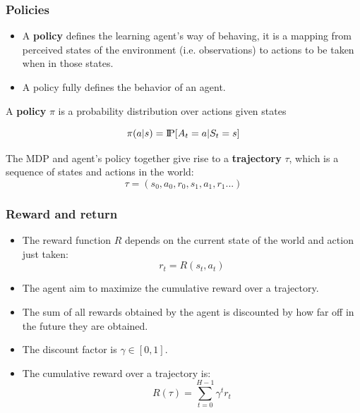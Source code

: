 \documentclass[9pt]{beamer}
\newcommand{\Pprob}{\text{I\kern-0.15em P}}
\begin{document}


\begin{frame}
	\frametitle{Policies}
\begin{itemize}
	\item A \textbf{policy} defines the learning agent's way of behaving, it is a mapping from perceived states of the environment (i.e. observations) to actions to be taken when in those states.
	\item A policy fully defines the behavior of an agent.
\end{itemize}

\begin{definition}
	 A \textbf{policy} $\pi$ is a probability distribution over actions given states
	
	\begin{equation}
	\pi(a | s) = \Pprob[A_t=a|S_t=s]
	\end{equation}

\end{definition}

The MDP and agent's policy together give rise to a \textbf{trajectory} $\tau$, which is a sequence of states and actions in the world:
$$\tau = (s_0, a_0, r_0, s_1, a_1, r_1...)$$

\end{frame}




\begin{frame}

	\frametitle{Reward and return}
	\begin{itemize}
		\item The reward function $R$ depends on the current state of the world and action just taken:
		$$r_t = R(s_t, a_t)$$
		\item The agent aim to maximize the cumulative reward over a trajectory.
		\item The sum of all rewards obtained by the agent is discounted by how far off in the future they are obtained. \item The discount factor is $\gamma \in [0,1]$.
		\item The cumulative reward over a trajectory is:		
			\begin{equation}
			R(\tau) = \sum_{t=0}^{H-1} \gamma^t r_t
			\end{equation}
	\end{itemize}
	
\end{frame}
\end{document}
